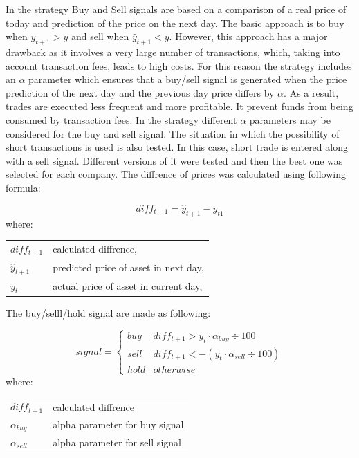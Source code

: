 \documentclass[11pt]{article} %
\makeatletter
\newenvironment{conditions}
  {\par\vspace{\abovedisplayskip}\noindent\begin{tabular}{>{$}l<{$} @{${}={}$} l}}
  {\end{tabular}\par\vspace{\belowdisplayskip}}
\makeatother
\begin{document}
In the strategy Buy and Sell signals are based on a comparison of a real price of today and prediction of the price on the next day. The basic approach is to buy when $\hat{y}_{t+1} > y$ and sell when $\hat{y}_{t+1} < y$. However, this approach has a major drawback as it involves a very large number of transactions, which, taking into account transaction fees, leads to high costs. For this reason the strategy includes an $\alpha$ parameter which ensures that a buy/sell signal is generated when the price prediction of the next day and the previous day price differs by $\alpha$. As a result, trades are executed less frequent and more profitable. It prevent funds from being consumed by transaction fees. In the strategy different $\alpha$ parameters may be considered for the buy and sell signal. The situation in which the possibility of short transactions is used is also tested. In this case, short trade is entered along with a sell signal. 
Different versions of it were tested and then the best one was selected for each company.
The diffrence of prices was calculated using following formula:

\begin{equation}  diff_{t+1} = \hat{y}_{t+1} - y_{t1} \end{equation}
where:
\begin{conditions}
diff_{t+1} & calculated diffrence, \\ 
 \hat{y}_{t+1}     &   predicted price of asset in next day,\\
 y_{t}     &  actual price of asset in current day,\\   
\end{conditions}

 \begin{flushleft} The buy/selll/hold signal are made as following: \end{flushleft} 
\begin{equation}
signal =  \left\{\begin{array}{ll} buy & diff_{t+1} >  y_{t} \cdot  \alpha_{buy} \div 100 \\ sell & diff_{t+1} <  -(y_{t} \cdot  \alpha_{sell} \div 100)\\  hold & otherwise \end{array}\right.
\end{equation}
where:
\begin{conditions}
diff_{t+1} & calculated diffrence \\ 
\alpha_{buy}     &  alpha parameter for buy signal \\   
\alpha_{sell}     &  alpha parameter for sell signal\\   
\end{conditions}
\end{document}
